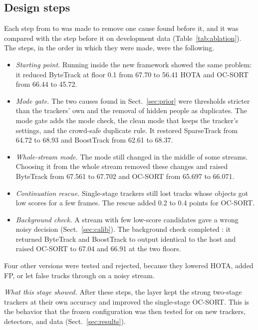 \subsection{Design steps}\label{sec:steps}
Each step from \aob{} to \scl{} was made to remove one cause found before it,
and it was compared with the step before it on development data
(Table~\ref{tab:ablation}). The steps, in the order in which they were made,
were the following.
\begin{itemize}
\item \emph{Starting point.} Running \aob{} inside the new framework showed
      the same problem: it reduced ByteTrack at floor 0.1 from 67.70 to 56.41
      HOTA and OC-SORT from 66.44 to 45.72.
\item \emph{Mode gate.} The two causes found in Sect.~\ref{sec:prior} were
      thresholds stricter than the trackers' own and the removal of hidden
      people as duplicates. The mode gate adds the mode check, the clean mode
      that keeps the tracker's settings, and the crowd-safe duplicate rule. It
      restored SparseTrack from 64.72 to 68.93 and BoostTrack from 62.61
      to 68.37.
\item \emph{Whole-stream mode.} The mode still changed in the middle of some
      streams. Choosing it from the whole stream removed these changes and
      raised ByteTrack from 67.561 to 67.702 and OC-SORT from 65.697 to
      66.071.
\item \emph{Continuation rescue.} Single-stage trackers still lost tracks
      whose objects got low scores for a few frames. The rescue added 0.2 to
      0.4 points for OC-SORT.
\item \emph{Background check.} A stream with few low-score candidates gave a
      wrong noisy decision (Sect.~\ref{sec:calib}). The background check
      completed \scl{}: it returned ByteTrack and BoostTrack to output
      identical to the host and raised OC-SORT to 67.04 and 66.91 at the two
      floors.
\end{itemize}
Four other versions were tested and rejected, because they lowered HOTA,
added FP, or let false tracks through on a noisy stream.

\emph{What this stage showed.} After these steps, the layer kept the strong
two-stage trackers at their own accuracy and improved the single-stage
OC-SORT. This is the behavior that the frozen configuration was then tested
for on new trackers, detectors, and data (Sect.~\ref{sec:results}).




